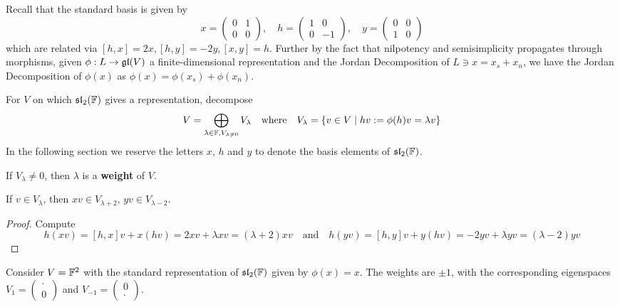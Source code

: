 \documentclass{article}
\begin{document}
Recall that the standard basis is given by
\[
    x = \begin{pmatrix}
        0 & 1 \\ 0 & 0     
    \end{pmatrix}, \quad
    h = \begin{pmatrix}
        1 & 0 \\ 0 & -1
    \end{pmatrix}, \quad
    y = \begin{pmatrix}
        0 & 0 \\ 1 & 0
    \end{pmatrix}
\]
which are related via $[h, x] = 2x, [h, y] = -2y, [x, y] = h$. Further by the fact that nilpotency and semisimplicity propagates through morphisms, given $\phi: L \to \mathfrak{gl}(V)$ a finite-dimensional representation and the Jordan Decomposition of $L \ni x = x_s + x_n$, we have the Jordan Decomposition of $\phi(x)$ as $\phi(x) = \phi(x_s) + \phi(x_n)$.

\begin{notation}
    For $V$ on which $\mathfrak{sl}_2(\mathbb{F})$ gives a representation, decompose
    \[
        V = \bigoplus_{\lambda \in \mathbb{F}, V_{\lambda \neq 0}} V_{\lambda} 
        \quad \text{where} \quad
        V_{\lambda} = \{ v \in V \mid hv := \phi(h)v = \lambda v \}
    \]
    In the following section we reserve the letters $x$, $h$ and $y$ to denote the basis elements of $\mathfrak{sl}_2(\mathbb{F})$.
\end{notation}
\nogap
\begin{definition}[Weight]
    If $V_{\lambda} \neq 0$, then $\lambda$ is a \textbf{weight} of $V$.
\end{definition}

\begin{lemma}\label{lem: transition between eigenspaces under action of sl2}
    If $v \in V_{\lambda}$, then $xv \in V_{\lambda + 2}$, $yv \in V_{\lambda - 2}$.
\end{lemma}

\begin{proof}
    Compute
    \[
        h(xv) = [h, x]v + x(hv) = 2xv + \lambda xv = (\lambda + 2)xv
        \quad \text{and} \quad
        h(yv) = [h, y]v + y(hv) = -2yv + \lambda yv = (\lambda - 2)yv
    \]
\end{proof}

\begin{example}
    Consider $V = \mathbb{F}^2$ with the standard representation of $\mathfrak{sl}_2(\mathbb{F})$ given by $\phi(x) = x$. The weights are $\pm 1$, with the corresponding eigenspaces $V_1 = \left(\begin{smallmatrix} \cdot \\ 0 \end{smallmatrix}\right)$ and $V_{-1} = \left(\begin{smallmatrix} 0 \\ \cdot \end{smallmatrix}\right)$.
\end{example}
\end{document}
